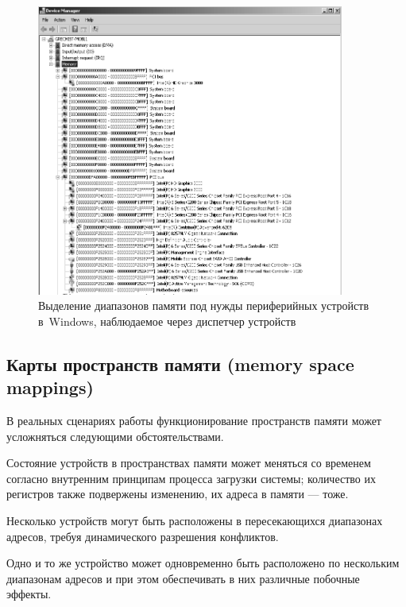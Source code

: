 \begin{figure}[htb]
    \centering
    \includegraphics[width=0.9\textwidth]{./memmap-device-manager}
    \caption[Выделение диапазонов памяти в~Windows]{Выделение диапазонов памяти под нужды периферийных устройств в~Windows, наблюдаемое через диспетчер устройств}
    \label{fig:memmap-device-manager}
\end{figure}


\subsection[Карты пространств памяти]{Карты пространств памяти (memory space mappings)}\label{sec:mem-maps}

В реальных сценариях работы функционирование пространств памяти может усложняться следующими обстоятельствами.

\begin{itemize*}
\item Состояние устройств в пространствах памяти может меняться со временем согласно внутренним принципам процесса загрузки системы; количество их регистров также подвержены изменению, их адреса в памяти --- тоже.
\item Несколько устройств могут быть расположены в пересекающихся диапазонах адресов, требуя динамического разрешения конфликтов.
\item Одно и то же устройство может одновременно быть расположено по нескольким диапазонам адресов и при этом обеспечивать в них различные побочные эффекты.
\end{itemize*}

